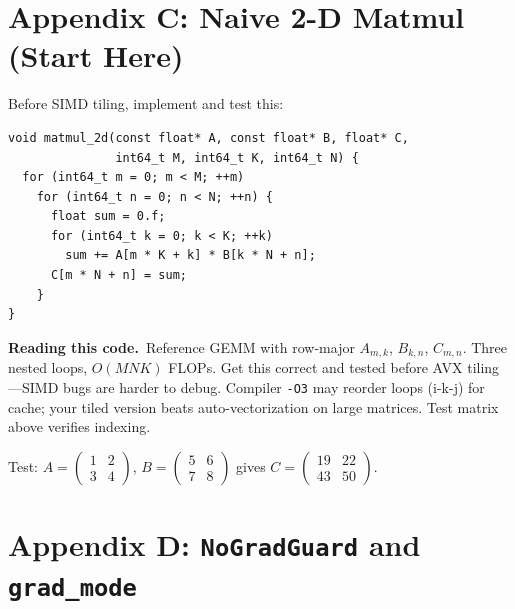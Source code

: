 \documentclass[11pt,a4paper]{article}
\newcommand{\explain}{\par\smallskip\noindent}
\newcommand{\exhead}{\textbf{Reading this code.}\ }
\begin{document}
\section{Appendix C: Naive 2-D Matmul (Start Here)}
\label{app:naive-matmul}

Before SIMD tiling, implement and test this:

\begin{lstlisting}[style=cpp]
void matmul_2d(const float* A, const float* B, float* C,
               int64_t M, int64_t K, int64_t N) {
  for (int64_t m = 0; m < M; ++m)
    for (int64_t n = 0; n < N; ++n) {
      float sum = 0.f;
      for (int64_t k = 0; k < K; ++k)
        sum += A[m * K + k] * B[k * N + n];
      C[m * N + n] = sum;
    }
}
\end{lstlisting}
\explain\exhead Reference GEMM with row-major $A_{m,k}$, $B_{k,n}$, $C_{m,n}$. Three nested loops,
$O(MNK)$ FLOPs. Get this correct and tested before AVX tiling---SIMD bugs are harder to debug.
Compiler \texttt{-O3} may reorder loops (i-k-j) for cache; your tiled version beats auto-vectorization
on large matrices. Test matrix above verifies indexing.

Test: $A=\begin{pmatrix}1&2\\3&4\end{pmatrix}$, $B=\begin{pmatrix}5&6\\7&8\end{pmatrix}$
gives $C=\begin{pmatrix}19&22\\43&50\end{pmatrix}$.

\section{Appendix D: \texttt{NoGradGuard} and \texttt{grad\_mode}}
\label{app:grad-mode}
\end{document}
